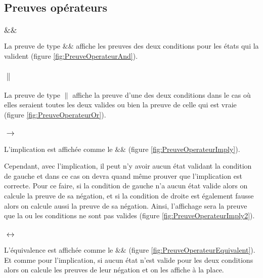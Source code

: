\documentclass[dvipsnames]{report}
\begin{document}
\subsection{Preuves opérateurs}

\subsubsection{$\&\&$}

La preuve de type $\&\&$ affiche les preuves des deux conditions pour les états qui la valident (figure \ref{fig:PreuveOperateurAnd}).



\subsubsection{$\|$}

La preuve de type $\|$ affiche la preuve d'une des deux conditions dans le cas où elles seraient toutes les deux valides ou bien la preuve de celle qui est vraie (figure \ref{fig:PreuveOperateurOr}).



\subsubsection{$\rightarrow$}

L'implication est affichée comme le $\&\&$ (figure \ref{fig:PreuveOperateurImply}).



Cependant, avec l'implication, il peut n'y avoir aucun état validant la condition de gauche et dans ce cas on devra quand même prouver que l'implication est correcte. Pour ce faire, si la condition de gauche n'a aucun état valide alors on calcule la preuve de sa négation, et si la condition de droite est également fausse alors on calcule aussi la preuve de sa négation. Ainsi, l'affichage sera la preuve que la ou les conditions ne sont pas valides (figure \ref{fig:PreuveOperateurImply2}).



\subsubsection{$\leftrightarrow$}

L'équivalence est affichée comme le $\&\&$ (figure \ref{fig:PreuveOperateurEquivalent}). Et comme pour l'implication, si aucun état n'est valide pour les deux conditions alors on calcule les preuves de leur négation et on les affiche à la place.
\end{document}
